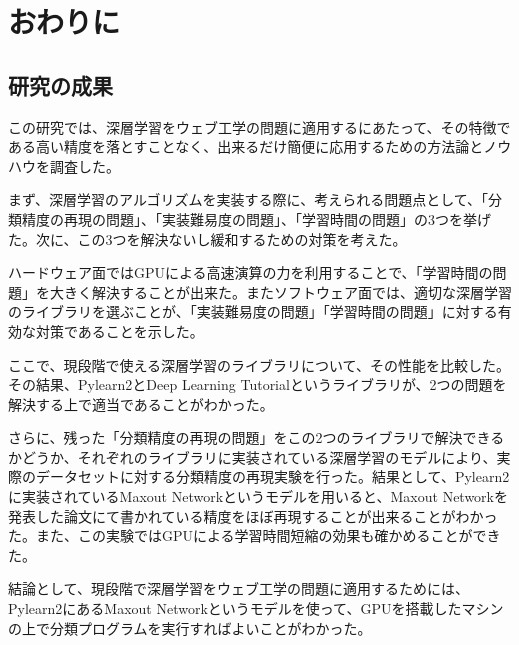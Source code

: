 \chapter{おわりに}
\section{研究の成果}

この研究では、深層学習をウェブ工学の問題に適用するにあたって、その特徴である高い精度を落とすことなく、出来るだけ簡便に応用するための方法論とノウハウを調査した。\par
まず、深層学習のアルゴリズムを実装する際に、考えられる問題点として、「分類精度の再現の問題」、「実装難易度の問題」、「学習時間の問題」の3つを挙げた。次に、この3つを解決ないし緩和するための対策を考えた。\par
ハードウェア面ではGPUによる高速演算の力を利用することで、「学習時間の問題」を大きく解決することが出来た。またソフトウェア面では、適切な深層学習のライブラリを選ぶことが、「実装難易度の問題」「学習時間の問題」に対する有効な対策であることを示した。\par
ここで、現段階で使える深層学習のライブラリについて、その性能を比較した。その結果、Pylearn2とDeep Learning Tutorialというライブラリが、2つの問題を解決する上で適当であることがわかった。\par
さらに、残った「分類精度の再現の問題」をこの2つのライブラリで解決できるかどうか、それぞれのライブラリに実装されている深層学習のモデルにより、実際のデータセットに対する分類精度の再現実験を行った。結果として、Pylearn2に実装されているMaxout Networkというモデルを用いると、Maxout Networkを発表した論文にて書かれている精度をほぼ再現することが出来ることがわかった。また、この実験ではGPUによる学習時間短縮の効果も確かめることができた。\par
結論として、現段階で深層学習をウェブ工学の問題に適用するためには、Pylearn2にあるMaxout Networkというモデルを使って、GPUを搭載したマシンの上で分類プログラムを実行すればよいことがわかった。

